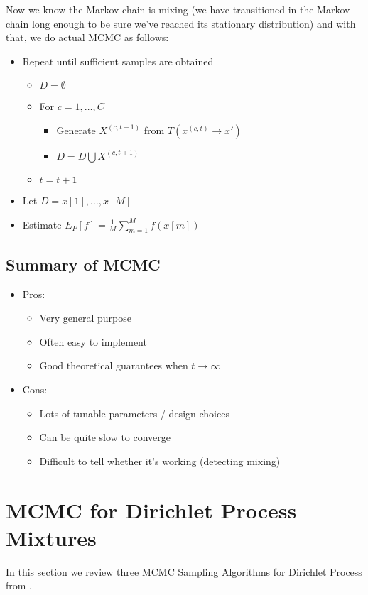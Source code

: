 \documentclass{article}
\begin{document}
    Now we know the Markov chain is mixing (we have transitioned in the Markov chain long enough to be sure we've reached its stationary distribution) and with that, we do actual MCMC as follows:
    
    \begin{itemize}
        \item Repeat until sufficient samples are obtained
        \begin{itemize}
            \item $D = \emptyset$
            \item For $c=1, \ldots, C$
            \begin{itemize}
                \item Generate $X^{(c, t+1)}$ from $T(x^{(c, t)} \rightarrow x')$
                \item $D = D \bigcup {X^{(c, t+1)}}$
            \end{itemize}
            \item $t = t+1$
        \end{itemize}
        \item Let $D = {x[1], \ldots, x[M]}$
        \item Estimate $E_P[f] = \frac{1}{M}\sum_{m=1}^M f(x[m])$
    \end{itemize}

\subsection{Summary of MCMC}
\begin{itemize}
    \item Pros:
    \begin{itemize}
        \item Very general purpose
        \item Often easy to implement
        \item Good theoretical guarantees when $t \rightarrow \infty$
    \end{itemize}
    \item Cons:
    \begin{itemize}
        \item Lots of tunable parameters / design choices
        \item Can be quite slow to converge
        \item Difficult to tell whether it's working (detecting mixing)
    \end{itemize}
\end{itemize}

\section{MCMC for Dirichlet Process Mixtures }
In this section we review three MCMC Sampling Algorithms for Dirichlet Process from \cite{neal}.
\end{document}
